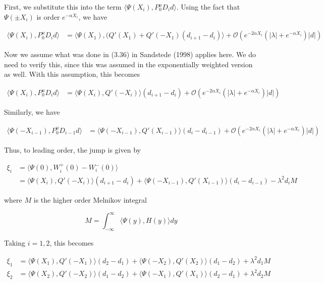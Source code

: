\documentclass[12pt]{article}
\begin{document}
\begin{enumerate}
First, we substitute this into the term $\langle \Psi(X_i), P^u_0 D_i d \rangle$. Using the fact that $\Psi(\pm X_i)$ is order $e^{-\alpha X_i}$, we have

\begin{align*}
\langle \Psi(X_i), P^u_0 D_i d \rangle &= \langle \Psi(X_1), (Q'(X_1) + Q'(-X_1 )(d_{i+1} - d_i ) \rangle + \mathcal{O} \left( e^{-2 \alpha X_i} \left( |\lambda| +  e^{-\alpha X_i}  \right) |d| \right)
\end{align*}

Now we assume what was done in (3.36) in Sandstede (1998) applies here. We do need to verify this, since this was assumed in the exponentially weighted version as well. With this assumption, this becomes

\begin{align*}
\langle \Psi(X_i), P^u_0 D_i d \rangle &= \langle \Psi(X_i), Q'(-X_i) \rangle (d_{i+1} - d_i ) + \mathcal{O} \left( e^{-2 \alpha X_i} \left( |\lambda| +  e^{-\alpha X_i}  \right) |d| \right)
\end{align*}

Similarly, we have

\begin{align*}
\langle \Psi(-X_{i-1}), P^u_0 D_{i-1} d \rangle &= \langle \Psi(-X_{i-1}), Q'(X_{i-1}) \rangle (d_i - d_{i-1} ) + \mathcal{O} \left( e^{-2 \alpha X_i} \left( |\lambda| +  e^{-\alpha X_i}  \right) |d| \right)
\end{align*}

Thus, to leading order, the jump is given by

\begin{align*}
\xi_i &= \langle \Psi(0), W_i^+(0) - W_i^-(0) \rangle \\
&= \langle \Psi(X_i), Q'(-X_i) \rangle (d_{i+1} - d_i ) + \langle \Psi(-X_{i-1}), Q'(X_{i-1}) \rangle (d_i - d_{i-1} ) - \lambda^2 d_i M
\end{align*}

where $M$ is the higher order Melnikov integral

\[
M = \int_{-\infty}^\infty \langle \Psi(y), H(y) \rangle dy
\]

Taking $i = 1, 2$, this becomes

\begin{align*}
\xi_1 &= \langle \Psi(X_1), Q'(-X_1) \rangle (d_2 - d_1 ) + \langle \Psi(-X_2), Q'(X_2) \rangle (d_1 - d_2 ) + \lambda^2 d_1 M \\
\xi_2 &= \langle \Psi(X_2), Q'(-X_2) \rangle (d_1 - d_2 ) + \langle \Psi(-X_1), Q'(X_1) \rangle (d_2 - d_1 ) + \lambda^2 d_2 M
\end{align*}


\end{enumerate}
\end{document}
